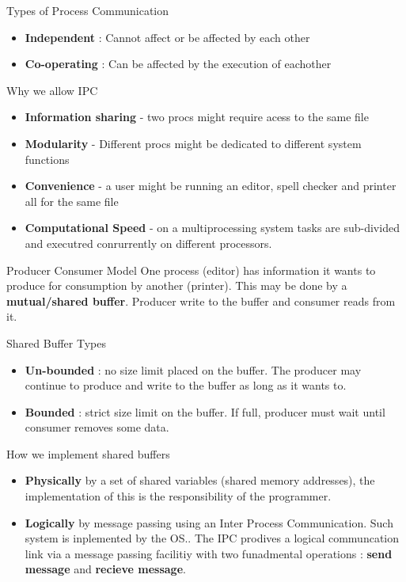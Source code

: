 \documentclass[a4paper, 10pt]{article}
\begin{document}
\begin{conceptbox}{Types of Process Communication}{}
    \begin{itemize}
        \item \textbf{Independent} : Cannot affect or be affected by each other
        \item \textbf{Co-operating} : Can be affected by the execution of eachother
    \end{itemize}
\end{conceptbox}
\begin{conceptbox}{Why we allow IPC}{}
    \begin{itemize}
        \item \textbf{Information sharing} - two procs might require acess to the same file
        \item \textbf{Modularity} - Different procs might be dedicated to different system functions
        \item \textbf{Convenience} - a user might be running an editor, spell checker and printer all for the same file
        \item \textbf{Computational Speed} - on a multiprocessing system tasks are sub-divided and executred conrurrently on different processors.
    \end{itemize}
\end{conceptbox}

\begin{definitionbox}{Producer Consumer Model}{}
    One process (editor) has information it wants to produce for consumption by another (printer). This may be done by a \textbf{mutual/shared buffer}. Producer write to the buffer and consumer reads from it.
\end{definitionbox}
\begin{conceptbox}{Shared Buffer Types}{}
    \begin{itemize}
        \item \textbf{Un-bounded} : no size limit placed on the buffer. The producer may continue to produce and write to the buffer as long as it wants to.
        \item \textbf{Bounded} : strict size limit on the buffer. If full, producer must wait until consumer removes some data.
    \end{itemize}
\end{conceptbox}
\begin{conceptbox}{How we implement shared buffers}{}
    \begin{itemize}
        \item \textbf{Physically} by a set of shared variables (shared memory addresses), the implementation of this is the responsibility of the programmer.
        \item \textbf{Logically} by message passing using an Inter Process Communication. Such system is inplemented by the OS.. The IPC prodives a logical communcation link via a message passing facilitiy with two funadmental operations : \textbf{send message} and \textbf{recieve message}.
    \end{itemize}
\end{conceptbox}
\end{document}

